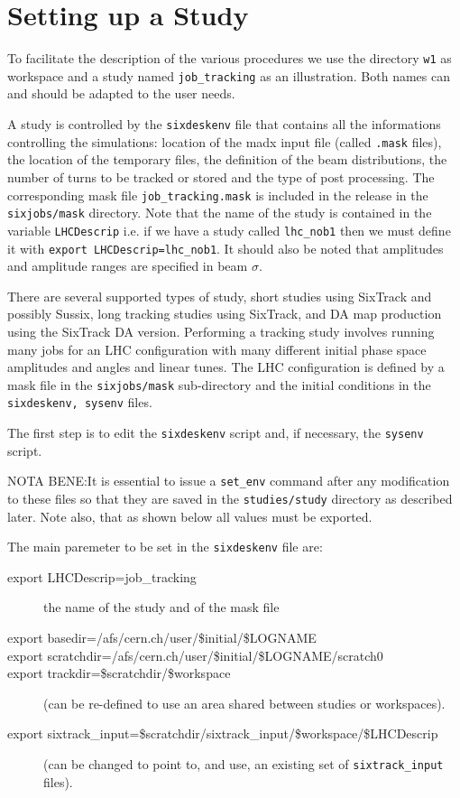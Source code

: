 \documentclass{cernatsnote}
\begin{document}
\section{Setting up a Study}
\label{sec:study}

To facilitate the description of the various procedures we use the directory
{\tt w1} as workspace and a study named {\tt job\_tracking} as an illustration.
Both names can and should be adapted to the user needs.

A study is controlled by the {\tt sixdeskenv} file that contains all the
informations controlling the simulations: location of the madx input file
(called {\tt .mask} files), the location of the temporary files, the definition
of the beam distributions, the number of turns to be tracked or stored and the
type of post processing. The corresponding mask file {\tt job\_tracking.mask}
is included in the release in the {\tt sixjobs/mask} directory. Note that the
name of the study is contained in the variable {\tt LHCDescrip} i.e. if we have
a study called {\tt lhc\_nob1} then we must define it with {\tt export
LHCDescrip=lhc\_nob1}. It should also be noted that amplitudes and amplitude
ranges are specified in beam $\sigma$.

There are several supported types of study, short studies using SixTrack and
possibly Sussix, long tracking studies using SixTrack, and DA map production
using the SixTrack DA version.  Performing a tracking study involves running
many jobs for an LHC configuration with many different initial phase space
amplitudes and angles and linear tunes. The LHC configuration is defined by a
mask file in the {\tt sixjobs/mask} sub-directory and the initial conditions
in the {\tt sixdeskenv, sysenv} files.

The first step is to edit the {\tt sixdeskenv} script and, if necessary, the
{\tt sysenv} script.

NOTA BENE:It is essential to issue a {\tt set\_env} command after any
modification to these files so that they are saved in the {\tt studies/study}
directory as described later.  Note also, that as shown below all values must
be exported.

The main paremeter to be set in the {\tt sixdeskenv} file are:
\begin{description}
\item [export LHCDescrip=job\_tracking] the name of the study and of the mask file
\item [export basedir=/afs/cern.ch/user/\$initial/\$LOGNAME]
\item [export scratchdir=/afs/cern.ch/user/\$initial/\$LOGNAME/scratch0]
\item [export trackdir=\$scratchdir/\$workspace]
(can be re-defined to use an area shared between studies or workspaces).
\item [export sixtrack\_input=\$scratchdir/sixtrack\_input/\$workspace/\$LHCDescrip]
(can be changed to point to, and use, an existing set of {\tt sixtrack\_input} files).
\end{description}
\end{document}
